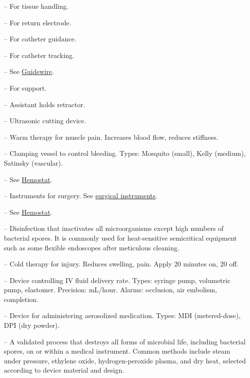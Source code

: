 -- For tissue handling.

-- For return electrode.

-- For catheter guidance.

-- For catheter tracking.

-- See \hyperlink{Guidewire}{Guidewire}.

-- For support.

-- Assistant holds retractor.


-- Ultrasonic cutting device.

-- Warm therapy for muscle pain. Increases blood flow, reduces stiffness.

-- Clamping vessel to control bleeding. Types: Mosquito (small), Kelly (medium), Satinsky (vascular).

-- See \hyperlink{Hemostat}{Hemostat}.

-- Instruments for surgery. See \hyperlink{Surgical Instruments}{surgical instruments}.

-- See \hyperlink{Hemostat}{Hemostat}.



-- Disinfection that inactivates all microorganisms except high numbers of bacterial spores. It is commonly used for heat-sensitive semicritical equipment such as some flexible endoscopes after meticulous cleaning.

-- Cold therapy for injury. Reduces swelling, pain. Apply 20 minutes on, 20 off.

-- Device controlling IV fluid delivery rate. Types: syringe pump, volumetric pump, elastomer. Precision: mL/hour. Alarms: occlusion, air embolism, completion.

-- Device for administering aerosolized medication. Types: MDI (metered-dose), DPI (dry powder).

-- A validated process that destroys all forms of microbial life, including bacterial spores, on or within a medical instrument. Common methods include steam under pressure, ethylene oxide, hydrogen-peroxide plasma, and dry heat, selected according to device material and design.

